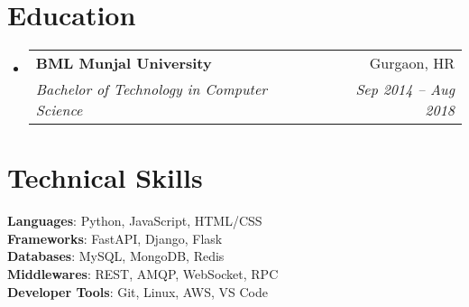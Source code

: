 \documentclass[letterpaper,11pt]{article}
\makeatletter
\newcommand{\resumeSubheading}[4]{
  \vspace{-2pt}\item
    \begin{tabular*}{0.97\textwidth}[t]{l@{\extracolsep{\fill}}r}
      \textbf{#1} & #2 \\
      \textit{\small#3} & \textit{\small #4} \\
    \end{tabular*}\vspace{-7pt}
}
\newcommand{\resumeSubHeadingListStart}{\begin{itemize}[leftmargin=0.15in, label={}]}
\newcommand{\resumeSubHeadingListEnd}{\end{itemize}}
\makeatother
\begin{document}
\section{Education}
  \resumeSubHeadingListStart
    \resumeSubheading
      {BML Munjal University}{Gurgaon, HR}
      {Bachelor of Technology in Computer Science}{Sep 2014 -- Aug 2018}
  \resumeSubHeadingListEnd

%
\section{Technical Skills}
 \begin{itemize}[leftmargin=0.15in, label={}]
    \small{\item{
     \textbf{Languages}{: Python, JavaScript, HTML/CSS} \\
     \textbf{Frameworks}{: FastAPI, Django, Flask } \\
     \textbf{Databases}{: MySQL, MongoDB, Redis} \\
     \textbf{Middlewares}{: REST, AMQP, WebSocket, RPC} \\
     \textbf{Developer Tools}{: Git, Linux, AWS, VS Code}
    }}
 \end{itemize}


\end{document}

